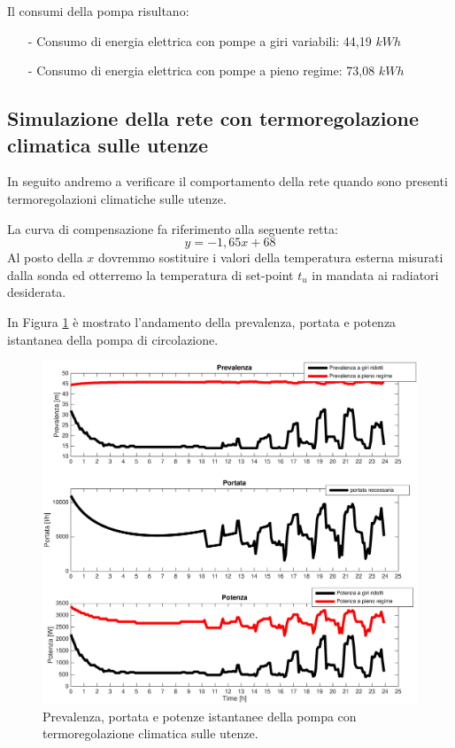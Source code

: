 \documentclass[laurea,oneside,11pt]{USiena_tesiLM}
\begin{document}
Il consumi della pompa risultano:
\begin{itemize}
\item[-] Consumo di energia elettrica con pompe a giri variabili: 44,19 $kWh$ 
\item[-] Consumo di energia elettrica con pompe a pieno regime: 73,08 $kWh$
\end{itemize}

\subsection{Simulazione della rete con termoregolazione climatica sulle utenze}
In seguito andremo a verificare il comportamento della rete quando sono presenti termoregolazioni climatiche sulle utenze. 

La curva di compensazione fa riferimento alla seguente retta:
\begin{equation}
y = -1,65 x + 68
\end{equation}
Al posto della $x$ dovremmo sostituire i valori della temperatura esterna misurati dalla sonda ed otterremo la temperatura di set-point $t_u$ in mandata ai radiatori  desiderata.

In Figura \ref{fig:sim_climatica} è mostrato l'andamento della prevalenza, portata e potenza istantanea della pompa di circolazione.

\begin{figure}[!ht]
\centering
\includegraphics[width=\textwidth]{figure/sim_climatica} 
\caption{Prevalenza, portata e potenze istantanee della pompa con termoregolazione climatica sulle utenze.}
\label{fig:sim_climatica}
\end{figure}
\end{document}
